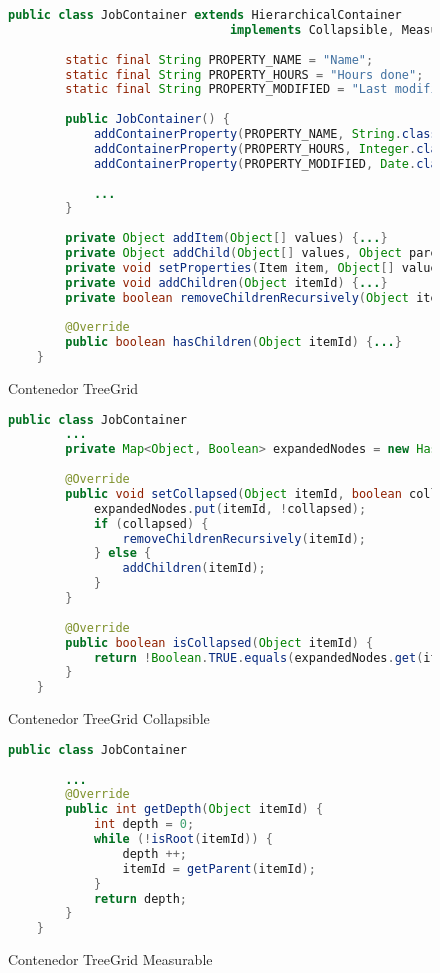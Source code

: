 \begin{figure}[!tb]
	\centering
	\begin{lstlisting}[language=Java]
	public class JobContainer extends HierarchicalContainer
                               implements Collapsible, Measurable {
	
		static final String PROPERTY_NAME = "Name";
		static final String PROPERTY_HOURS = "Hours done";
		static final String PROPERTY_MODIFIED = "Last modified";
		
		public JobContainer() {
			addContainerProperty(PROPERTY_NAME, String.class, "");
			addContainerProperty(PROPERTY_HOURS, Integer.class, 0);
			addContainerProperty(PROPERTY_MODIFIED, Date.class, new Date());
			
			...	
		}
		
		private Object addItem(Object[] values) {...}
		private Object addChild(Object[] values, Object parentId) {...}
		private void setProperties(Item item, Object[] values) {...}
		private void addChildren(Object itemId) {...}
		private boolean removeChildrenRecursively(Object itemId) {...}
		
		@Override
		public boolean hasChildren(Object itemId) {...}
	}
    \end{lstlisting}
	\caption{Contenedor TreeGrid}
	\label{fig:jobContainer}
\end{figure}


\begin{figure}[!tb]
	\centering
	\begin{lstlisting}[language=Java]
	public class JobContainer
		...
		private Map<Object, Boolean> expandedNodes = new HashMap<>();
			
		@Override
		public void setCollapsed(Object itemId, boolean collapsed) {
			expandedNodes.put(itemId, !collapsed);	
			if (collapsed) {
				removeChildrenRecursively(itemId);
			} else {
				addChildren(itemId);
			}
		}
		
		@Override
		public boolean isCollapsed(Object itemId) {
			return !Boolean.TRUE.equals(expandedNodes.get(itemId));
		}
	}\end{lstlisting}
	\caption{Contenedor TreeGrid Collapsible}
	\label{fig:jobContainerCollapsible}
\end{figure}

\begin{figure}[!tb]
	\centering
	\begin{lstlisting}[language=Java]	
	public class JobContainer
	
		...
		@Override
		public int getDepth(Object itemId) {
			int depth = 0;
			while (!isRoot(itemId)) {
				depth ++;
				itemId = getParent(itemId);
			}
			return depth;
		}
	}\end{lstlisting}
	\caption{Contenedor TreeGrid Measurable}
	\label{fig:jobContainerMeasurable}
\end{figure}

